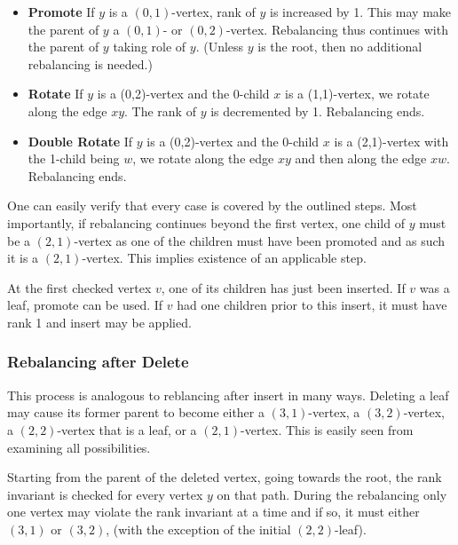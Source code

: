 \begin{itemize}
	\item \textbf{Promote} If $y$ is a $(0,1)$-vertex, rank of $y$ is increased by 1. This may make the parent of $y$ a $(0,1)$- or $(0,2)$-vertex. Rebalancing thus continues with the parent of $y$ taking role of $y$. (Unless $y$ is the root, then no additional rebalancing is needed.)
	\item \textbf{Rotate} If $y$ is a (0,2)-vertex and the 0-child $x$ is a (1,1)-vertex, we rotate along the edge $xy$. The rank of $y$ is decremented by 1. Rebalancing ends.
	\item \textbf{Double Rotate} If $y$ is a (0,2)-vertex and the 0-child $x$ is a (2,1)-vertex with the 1-child being $w$, we rotate along the edge $xy$ and then along the edge $xw$. Rebalancing ends.
\end{itemize}

One can easily verify that every case is covered by the outlined steps. Most importantly, if rebalancing continues beyond the first vertex, one child of $y$ must be a $(2,1)$-vertex as one of the children must have been promoted and as such it is a $(2,1)$-vertex. This implies existence of an applicable step. 

At the first checked vertex $v$, one of its children has just been inserted. If $v$ was a leaf, promote can be used. If $v$ had one children prior to this insert, it must have rank 1 and insert may be applied. 



\subsubsection*{Rebalancing after Delete}

This process is analogous to reblancing after insert in many ways. Deleting a leaf may cause its former parent to become either a $(3,1)$-vertex, a $(3,2)$-vertex, a $(2,2)$-vertex that is a leaf, or a $(2,1)$-vertex. This is easily seen from examining all possibilities. 

Starting from the parent of the deleted vertex, going towards the root, the rank invariant is checked for every vertex $y$ on that path.  During the rebalancing only one vertex may violate the rank invariant at a time and if so, it must either $(3,1)$ or $(3,2)$, (with the exception of the initial $(2,2)$-leaf).

